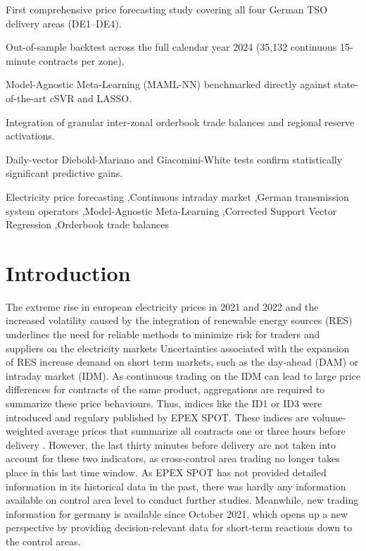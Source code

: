 \documentclass[preprint,12pt,nonatbib]{elsarticle}
\begin{document}
\begin{frontmatter}
\begin{highlights}
\item First comprehensive price forecasting study covering all four German TSO delivery areas (DE1--DE4).
\item Out-of-sample backtest across the full calendar year 2024 (35,132 continuous 15-minute contracts per zone).
\item Model-Agnostic Meta-Learning (MAML-NN) benchmarked directly against state-of-the-art cSVR and LASSO.
\item Integration of granular inter-zonal orderbook trade balances and regional reserve activations.
\item Daily-vector Diebold-Mariano and Giacomini-White tests confirm statistically significant predictive gains.
\end{highlights}

\begin{keyword}
Electricity price forecasting \sep Continuous intraday market \sep German transmission system operators \sep Model-Agnostic Meta-Learning \sep Corrected Support Vector Regression \sep Orderbook trade balances
\end{keyword}

\end{frontmatter}

\section{Introduction}

The extreme rise in european electricity prices in 2021 and 2022 and the increased volatility caused by the integration of renewable energy
sources (RES) underlines the need for reliable methods to minimize risk for traders and suppliers on the electricity markets \cite{Janczura.2023, Kraft.2023}
Uncertainties associated with the expansion of RES increase demand on short term markets, such as the day-ahead (DAM) or intraday market (IDM).
As continuous trading on the IDM can lead to large price differences for contracts of the same product, aggregations are required to summarize these price behaviours.
Thus, indices like the ID1 or ID3 were introduced and regulary published by EPEX SPOT.
These indices are volume-weighted average prices that summarize all contracts one or three hours before delivery \cite{EPEXSPOT.2015, Marcjasz.2020, Narajewski.2020}.
However, the last thirty minutes before delivery are not taken into account for these two indicators, as cross-control area trading no longer takes place in this last time window.
As EPEX SPOT has not provided detailed information in its historical data in the past, there was hardly any information available on control area level to conduct further studies.
Meanwhile, new trading information for germany is available since October 2021, which opens up a new perspective by providing decision-relevant data for short-term reactions down to the control areas.
\end{document}
